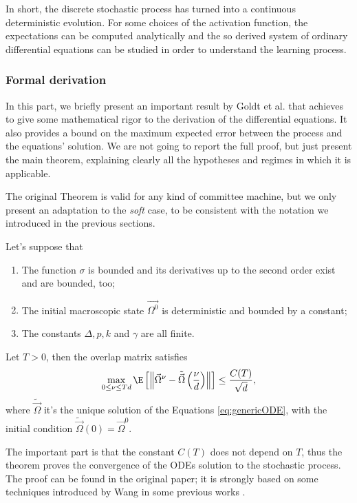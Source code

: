 In short, the discrete stochastic process has turned into a continuous deterministic evolution.
For some choices of the activation function, the expectations can be computed analytically and
the so derived system of ordinary differential equations can be studied in order
to understand the learning process.

\subsubsection{Formal derivation}
In this part, we briefly present an important result by Goldt et al.\cite{goldt2019dynamics}
that achieves to give some mathematical rigor to the derivation of the differential
equations. It also provides a bound on the maximum expected error between the process
and the equations' solution. We are not going to report the full proof, but just 
present the main theorem, explaining clearly all the hypotheses and regimes in which
it is applicable.

The original Theorem is valid for any kind of committee machine, but we only present
an adaptation to the \emph{soft} case, to be consistent with the notation
we introduced in the previous sections.
\begin{theorem}\label{thm:process_to_ode_goldt}
  Let's suppose that
  \begin{enumerate}
    \item The function \(\sigma\) is bounded and its derivatives up to the second order exist and are bounded, too;
    \item The initial macroscopic state \(\vec{\Omega^0}\) is deterministic and bounded by a constant;
    \item The constants \(\Delta, p, k\) and \(\gamma\) are all finite.
  \end{enumerate}
  Let \(T>0\), then the overlap matrix satisfies 
  \begin{equation}
    \max_{0\le\nu\le Td} \E\left[
      \left\|\vec{\Omega}^\nu - \tilde{\vec{\Omega}}\left(\frac{\nu}{d}\right)\right\|
    \right]
    \le
    \frac{C{(T)}}{\sqrt{d}},
  \end{equation}
  where \(\tilde{\vec{\Omega}}\) it's the unique solution of the Equations \eqref{eq:genericODE},
  with the initial condition \(\tilde{\vec{\Omega}}{(0)} = \vec{\Omega}^0\). 
\end{theorem}
The important part is that the constant \(C{(T)}\) does not depend on \(T\), thus 
the theorem proves the convergence of the ODEs solution to the stochastic process.
The proof can be found in the original paper\cite{goldt2019dynamics};
it is strongly based on some techniques introduced by Wang in some previous works
\cite{wang2017scaling,wang2019solvable}.

